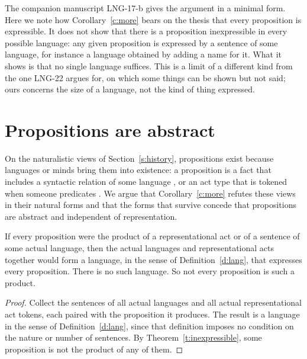 \documentclass{situationist-preprint}
\begin{document}
The companion manuscript LNG-17-b gives the argument in a minimal form. Here we note how Corollary~\ref{c:more} bears on the thesis that every proposition is expressible. It does not show that there is a proposition inexpressible in every possible language: any given proposition is expressed by a sentence of some language, for instance a language obtained by adding a name for it. What it shows is that no single language suffices. This is a limit of a different kind from the one LNG-22 argues for, on which some things can be shown but not said; ours concerns the size of a language, not the kind of thing expressed.

\section{Propositions are abstract}\label{s:abstract}

On the naturalistic views of Section~\ref{s:history}, propositions exist because languages or minds bring them into existence: a proposition is a fact that includes a syntactic relation of some language \citep{King2007}, or an act type that is tokened when someone predicates \citep{Soames2010,Hanks2015}. We argue that Corollary~\ref{c:more} refutes these views in their natural forms and that the forms that survive concede that propositions are abstract and independent of representation.

\begin{proposition}\label{p:noact}
If every proposition were the product of a representational act or of a sentence of some actual language, then the actual languages and representational acts together would form a language, in the sense of Definition~\ref{d:lang}, that expresses every proposition. There is no such language. So not every proposition is such a product.
\end{proposition}

\begin{proof}
Collect the sentences of all actual languages and all actual representational act tokens, each paired with the proposition it produces. The result is a language in the sense of Definition~\ref{d:lang}, since that definition imposes no condition on the nature or number of sentences. By Theorem~\ref{t:inexpressible}, some proposition is not the product of any of them.
\end{proof}
\end{document}
